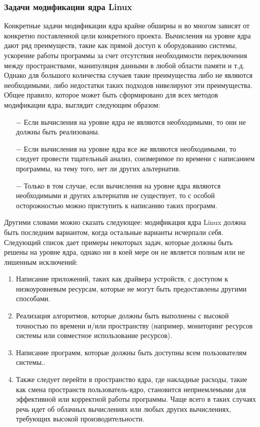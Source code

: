 \subsubsection{Задачи модификации ядра Linux}\label{subsec:---linux}
Конкретные задачи модификации ядра крайне обширны и во многом зависят от конкретно поставленной цели конкретного проекта.
Вычисления на уровне ядра дают ряд преимуществ, такие как прямой доступ к оборудованию системы,
ускорение работы программы за счет отсутствия необходимости переключения между пространствами,
манипуляция данными в любой области памяти и т.д.
Однако для большого количества случаев такие преимущества либо не являются необходимыми, либо недостатки таких подходов нивелируют эти преимущества.
Общее правило, которое может быть сформировано для всех методов модификации ядра, выглядит следующим образом:
\begin{itemize}
    \item[$-$] Если вычисления на уровне ядра не являются необходимыми, то они не должны быть реализованы.
    \item[$-$] Если вычисления на уровне ядра все же являются необходимыми, то следует провести тщательный анализ, соизмеримое по времени с написанием программы, на тему того, нет ли других альтернатив.
    \item[$-$] Только в том случае, если вычисления на уровне ядра являются необходимыми и других альтернатив не существует, то с особой осторожностью можно приступить к написанию таких программ.
\end{itemize}

Другими словами можно сказать следующее: модификация ядра Linux должна быть последним вариантом,
когда остальные варианты исчерпали себя.
\\
Следующий список дает примеры некоторых задач, которые должны быть решены на уровне ядра, однако ни в коей мере он не является полным или не лишенным исключений:
\begin{enumerate}
    \item Написание приложений, таких как драйвера устройств, с доступом к низкоуровневым ресурсам, которые не могут быть предоставлены другими способами.
    \item Реализация алгоритмов, которые должны быть выполнены с высокой точностью по времени и/или пространству (например, мониторинг ресурсов системы или совместное использование ресурсов)\cite{overhead-timer}.
    \item Написание программ, которые должны быть доступны всем пользователям системы.\cite{overhead-timer}.
    \item Также следует перейти в пространство ядра, где накладные расходы, такие как смена пространств пользователь-ядро, становится неприемлемыми для эффективной или корректной работы программы\cite{overhead-timer}.
    Чаще всего в таких случаях речь идет об облачных вычислениях\cite{overhead-cloud} или любых других вычислениях, требующих высокой производительности.
\end{enumerate}
